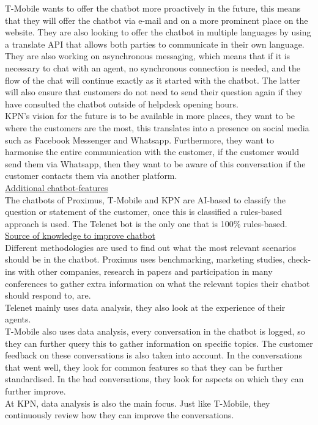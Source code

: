 \break
T-Mobile wants to offer the chatbot more proactively in the future, this means that they will offer the chatbot via e-mail and on a more prominent place on the website. They are also looking to offer the chatbot in multiple languages by using a translate API that allows both parties to communicate in their own language. They are also working on asynchronous messaging, which means that if it is necessary to chat with an agent, no synchronous connection is needed, and the flow of the chat will continue exactly as it started with the chatbot. The latter will also ensure that customers do not need to send their question again if they have consulted the chatbot outside of helpdesk opening hours.\\
\break
KPN's vision for the future is to be available in more places, they want to be where the customers are the most, this translates into a presence on social media such as Facebook Messenger and Whatsapp. Furthermore, they want to harmonise the entire communication with the customer, if the customer would send them via Whatsapp, then they want to be aware of this conversation if the customer contacts them via another platform.\\
\break
\ul{Additional chatbot-features}\\
The chatbots of Proximus, T-Mobile and KPN are AI-based to classify the question or statement of the customer, once this is classified a rules-based approach is used. The Telenet bot is the only one that is 100\% rules-based.\\
\break
\ul{Source of knowledge to improve chatbot}\\
Different methodologies are used to find out what the most relevant scenarios should be in the chatbot. Proximus uses benchmarking, marketing studies, check-ins with other companies, research in papers and participation in many conferences to gather extra information on what the relevant topics their chatbot should respond to, are.\\
\break
Telenet mainly uses data analysis, they also look at the experience of their agents.\\
\break
T-Mobile also uses data analysis, every conversation in the chatbot is logged, so they can further query this to gather information on specific topics. The customer feedback on these conversations is also taken into account. In the conversations that went well, they look for common features so that they can be further standardised. In the bad conversations, they look for aspects on which they can further improve.\\
\break
At KPN, data analysis is also the main focus. Just like T-Mobile, they continuously review how they can improve the conversations.\\
\break
